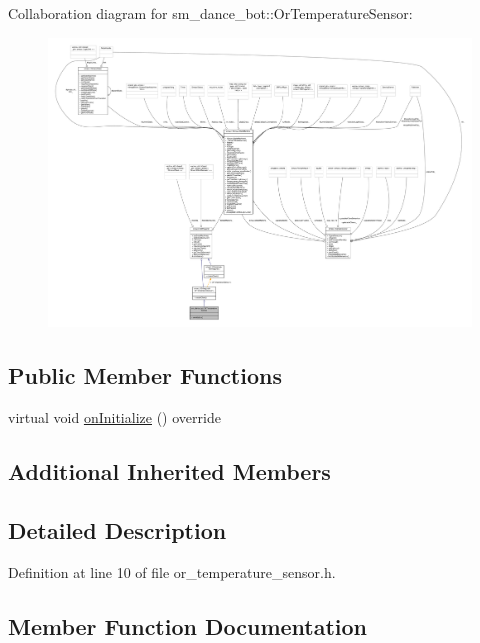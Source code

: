 Collaboration diagram for sm\+\_\+dance\+\_\+bot\+:\+:Or\+Temperature\+Sensor\+:\nopagebreak
\begin{figure}[H]
\begin{center}
\leavevmode
\includegraphics[width=350pt]{classsm__dance__bot_1_1OrTemperatureSensor__coll__graph}
\end{center}
\end{figure}
\subsection*{Public Member Functions}
\begin{DoxyCompactItemize}
\item 
virtual void \hyperlink{classsm__dance__bot_1_1OrTemperatureSensor_a2e944e459a695774dcf7fdbd5ac93b01}{on\+Initialize} () override
\end{DoxyCompactItemize}
\subsection*{Additional Inherited Members}


\subsection{Detailed Description}


Definition at line 10 of file or\+\_\+temperature\+\_\+sensor.\+h.



\subsection{Member Function Documentation}
